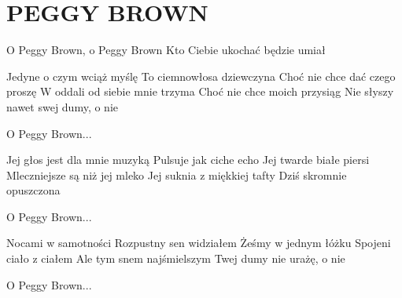 \documentclass[../../../songbook.tex]{subfiles}
\begin{document}
\TabPositions{8cm} %
\section*{PEGGY BROWN}
{}
\vspace{0.5cm}
\-\hspace{1cm} O Peggy Brown, o Peggy Brown		 \newline	
\-\hspace{1cm} Kto Ciebie ukochać będzie umiał	\newline

Jedyne o czym wciąż myślę		 \newline	
To ciemnowłosa dziewczyna		\newline
Choć nie chce dać czego proszę		 \newline	
W oddali od siebie mnie trzyma		 \newline	
Choć nie chce moich przysiąg		 \newline	
Nie słyszy nawet swej dumy, o nie	 \newline	

\-\hspace{1cm} O Peggy Brown...		 \newline	

Jej głos jest dla mnie muzyką		 \newline	
Pulsuje jak ciche echo		 \newline	
Jej twarde białe piersi		 \newline	
Mleczniejsze są niż jej mleko		 \newline	
Jej suknia z miękkiej tafty		 \newline	
Dziś skromnie opuszczona		 \newline	

\-\hspace{1cm} O Peggy Brown...		 \newline	

Nocami w samotności		 \newline	
Rozpustny sen widziałem		 \newline	
Żeśmy w jednym łóżku		 \newline	
Spojeni ciało z ciałem		 \newline	
Ale tym snem najśmielszym		 \newline	
Twej dumy nie urażę, o nie		 \newline	

\-\hspace{1cm} O Peggy Brown...		 \newline	
\end{document}

